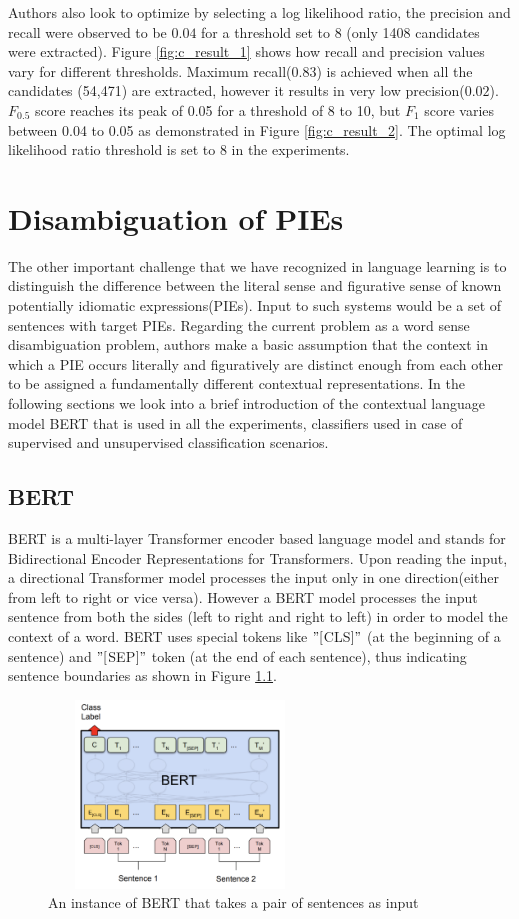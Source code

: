 \documentclass[11pt,a4paper]{article}
\begin{document}
Authors also look to optimize by selecting a log likelihood ratio, the precision and recall were observed to be $0.04$ for a threshold set to 8 (only 1408 candidates were extracted). Figure \ref{fig:c_result_1} shows how recall and precision values vary for different thresholds. Maximum recall($0.83$) is achieved when all the candidates (54,471) are extracted, however it results in very low precision($0.02$). $F_{0.5}$ score reaches its peak of 0.05 for a threshold of 8 to 10, but $F_{1}$ score varies between 0.04 to 0.05 as demonstrated in Figure \ref{fig:c_result_2}. The optimal log likelihood ratio threshold is set to 8 in the experiments.

\section{Disambiguation of PIEs}
The other important challenge that we have recognized in language learning is to distinguish the difference between the literal sense and figurative sense of known potentially idiomatic expressions(PIEs). Input to such systems would be a set of sentences with target PIEs. Regarding the current problem as a word sense disambiguation problem, authors make a basic assumption that the context in which a PIE occurs literally and figuratively are distinct enough from each other to be assigned a fundamentally different contextual representations. In the following sections we look into a brief introduction of the contextual language model BERT that is used in all the experiments, classifiers used in case of supervised and unsupervised classification scenarios.

\subsection{BERT}
BERT is a multi-layer Transformer encoder based language model and stands for Bidirectional Encoder Representations for Transformers. Upon reading the input, a directional Transformer model processes the input only in one direction(either from left to right or vice versa). However a BERT model processes the input sentence from both the sides (left to right and right to left) in order to model the context of a word. BERT uses special tokens like $"[$CLS$]"$ (at the beginning of a sentence) and $"[$SEP$]"$ token (at the end of each sentence), thus indicating sentence boundaries as shown in Figure \ref{}.

\begin{figure}[H]
  \includegraphics[width=7cm, height=5cm]{gfx/bert1.png}
  \caption{An instance of BERT that takes a pair of sentences as input}
  \label{fig:p_bert1}
\end{figure}
\end{document}
